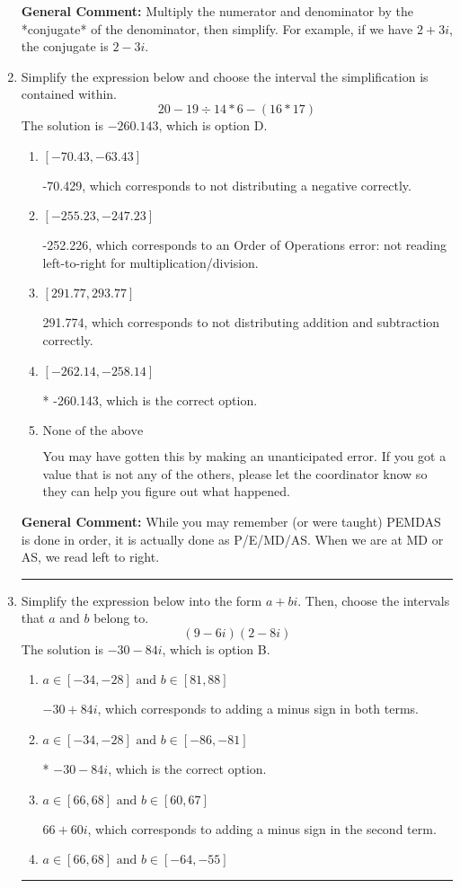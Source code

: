 \documentclass{extbook}[14pt]
\newcommand{\litem}[1]{\item #1

\rule{\textwidth}{0.4pt}}
\begin{document}
\begin{enumerate}
{\textbf{General Comment:} Multiply the numerator and denominator by the *conjugate* of the denominator, then simplify. For example, if we have $2+3i$, the conjugate is $2-3i$.
}
\litem{
Simplify the expression below and choose the interval the simplification is contained within.
\[ 20 - 19 \div 14 * 6 - (16 * 17) \]The solution is \( -260.143 \), which is option D.\begin{enumerate}[label=\Alph*.]
\item \( [-70.43, -63.43] \)

 -70.429, which corresponds to not distributing a negative correctly.
\item \( [-255.23, -247.23] \)

 -252.226, which corresponds to an Order of Operations error: not reading left-to-right for multiplication/division.
\item \( [291.77, 293.77] \)

 291.774, which corresponds to not distributing addition and subtraction correctly.
\item \( [-262.14, -258.14] \)

* -260.143, which is the correct option.
\item \( \text{None of the above} \)

 You may have gotten this by making an unanticipated error. If you got a value that is not any of the others, please let the coordinator know so they can help you figure out what happened.
\end{enumerate}

\textbf{General Comment:} While you may remember (or were taught) PEMDAS is done in order, it is actually done as P/E/MD/AS. When we are at MD or AS, we read left to right.
}
\litem{
Simplify the expression below into the form $a+bi$. Then, choose the intervals that $a$ and $b$ belong to.
\[ (9 - 6 i)(2 - 8 i) \]The solution is \( -30 - 84 i \), which is option B.\begin{enumerate}[label=\Alph*.]
\item \( a \in [-34, -28] \text{ and } b \in [81, 88] \)

 $-30 + 84 i$, which corresponds to adding a minus sign in both terms.
\item \( a \in [-34, -28] \text{ and } b \in [-86, -81] \)

* $-30 - 84 i$, which is the correct option.
\item \( a \in [66, 68] \text{ and } b \in [60, 67] \)

 $66 + 60 i$, which corresponds to adding a minus sign in the second term.
\item \( a \in [66, 68] \text{ and } b \in [-64, -55] \)


\end{enumerate}}
\end{enumerate}
\end{document}
